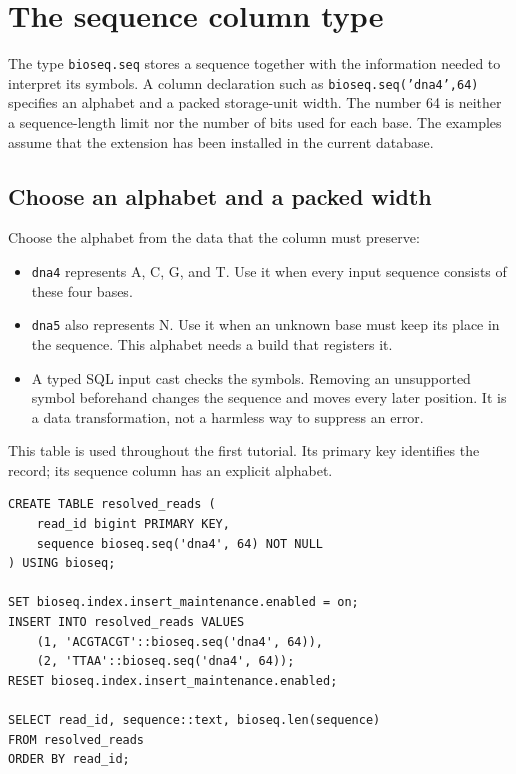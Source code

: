 \section{The sequence column type}
\label{sec:appendix-sequence-type}

The type \texttt{bioseq.seq} stores a sequence together with the information
needed to interpret its symbols. A column declaration such as
\texttt{bioseq.seq('dna4',64)} specifies an alphabet and a packed storage-unit
width. The number 64 is neither a sequence-length limit nor the number of bits
used for each base. The examples assume that the extension has been installed
in the current database.

\subsection{Choose an alphabet and a packed width}

Choose the alphabet from the data that the column must preserve:
\begin{itemize}
  \item \texttt{dna4} represents A, C, G, and T. Use it when every input
    sequence consists of these four bases.
  \item \texttt{dna5} also represents N. Use it when an unknown base must keep
    its place in the sequence. This alphabet needs a build that registers it.
  \item A typed SQL input cast checks the symbols. Removing an unsupported
    symbol beforehand changes the sequence and moves every later position.
    It is a data transformation, not a harmless way to suppress an error.
\end{itemize}

This table is used throughout the first tutorial. Its primary key identifies
the record; its sequence column has an explicit alphabet.

\par\noindent\begin{minipage}{\linewidth}
\begin{lstlisting}[style=bioseq-appendix-sql]
CREATE TABLE resolved_reads (
    read_id bigint PRIMARY KEY,
    sequence bioseq.seq('dna4', 64) NOT NULL
) USING bioseq;

SET bioseq.index.insert_maintenance.enabled = on;
INSERT INTO resolved_reads VALUES
    (1, 'ACGTACGT'::bioseq.seq('dna4', 64)),
    (2, 'TTAA'::bioseq.seq('dna4', 64));
RESET bioseq.index.insert_maintenance.enabled;

SELECT read_id, sequence::text, bioseq.len(sequence)
FROM resolved_reads
ORDER BY read_id;
\end{lstlisting}
\end{minipage}

